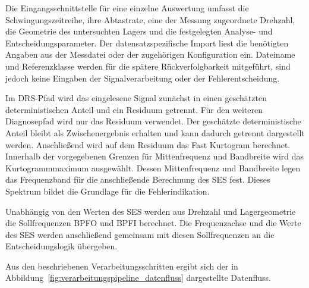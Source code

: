 
Die Eingangsschnittstelle für eine einzelne Auswertung umfasst die
Schwingungszeitreihe, ihre Abtastrate, eine der Messung zugeordnete Drehzahl,
die Geometrie des untersuchten Lagers und die festgelegten Analyse- und
Entscheidungsparameter. Der datensatzspezifische Import liest die benötigten
Angaben aus der Messdatei oder der zugehörigen Konfiguration ein. Dateiname und
Referenzklasse werden für die spätere Rückverfolgbarkeit mitgeführt, sind
jedoch keine Eingaben der Signalverarbeitung oder der Fehlerentscheidung.

Im DRS-Pfad wird das eingelesene Signal zunächst in einen geschätzten
deterministischen Anteil und ein Residuum getrennt. Für den weiteren
Diagnosepfad wird nur das Residuum verwendet. Der geschätzte deterministische
Anteil bleibt als Zwischenergebnis erhalten und kann dadurch getrennt
dargestellt werden. Anschließend wird auf dem Residuum das Fast Kurtogram
berechnet. Innerhalb der vorgegebenen Grenzen für Mittenfrequenz und Bandbreite
wird das Kurtogrammmaximum ausgewählt. Dessen Mittenfrequenz und Bandbreite
legen das Frequenzband für die anschließende Berechnung des \acrshort{SES} fest.
Dieses Spektrum bildet die Grundlage für die Fehlerindikation.

Unabhängig von den Werten des \acrshort{SES} werden aus Drehzahl und
Lagergeometrie die Sollfrequenzen BPFO und BPFI berechnet. Die Frequenzachse
und die Werte des \acrshort{SES} werden anschließend gemeinsam mit diesen
Sollfrequenzen an die Entscheidungslogik übergeben.

Aus den beschriebenen Verarbeitungsschritten ergibt sich der in
Abbildung~\ref{fig:verarbeitungspipeline_datenfluss} dargestellte Datenfluss.

